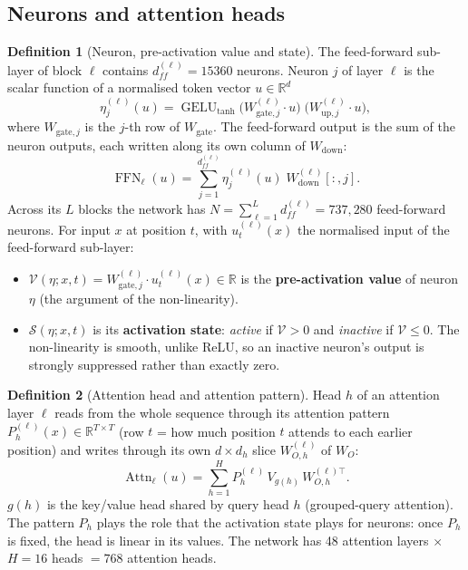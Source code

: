 \documentclass[10pt,a4paper]{article}
\newcommand{\op}[1]{\operatorname{#1}}
\theoremstyle{definition}
\newtheorem{definition}{Definition}[section]
\begin{document}
\subsection{Neurons and attention heads}
\begin{definition}[Neuron, pre-activation value and state]
The feed-forward sub-layer of block $\ell$ contains $d_{ff}^{(\ell)}=15360$ neurons. Neuron $j$ of layer $\ell$ is the scalar function of a normalised token vector $u\in\mathbb{R}^{d}$
\begin{equation}
  \eta^{(\ell)}_j(u) = \op{GELU}_{\tanh}\big(W^{(\ell)}_{\mathrm{gate},j}\cdot u\big)\;\big(W^{(\ell)}_{\mathrm{up},j}\cdot u\big),
\end{equation}
where $W_{\mathrm{gate},j}$ is the $j$-th row of $W_{\mathrm{gate}}$. The feed-forward output is the sum of the neuron outputs, each written along its own column of $W_{\mathrm{down}}$:
\begin{equation}
  \op{FFN}_\ell(u) = \sum_{j=1}^{d_{ff}^{(\ell)}} \eta^{(\ell)}_j(u)\;W^{(\ell)}_{\mathrm{down}}[:,j].
\end{equation}
Across its $L$ blocks the network has $N=\sum_{\ell=1}^{L} d_{ff}^{(\ell)}=737{,}280$ feed-forward neurons. For input $x$ at position $t$, with $u^{(\ell)}_t(x)$ the normalised input of the feed-forward sub-layer:
\begin{itemize}
\item $\mathcal{V}(\eta;x,t)=W^{(\ell)}_{\mathrm{gate},j}\cdot u^{(\ell)}_t(x)\in\mathbb{R}$ is the \textbf{pre-activation value} of neuron $\eta$ (the argument of the non-linearity).
\item $\mathcal{S}(\eta;x,t)$ is its \textbf{activation state}: \emph{active} if $\mathcal{V}>0$ and \emph{inactive} if $\mathcal{V}\le 0$. The non-linearity is smooth, unlike ReLU, so an inactive neuron's output is strongly suppressed rather than exactly zero.
\end{itemize}
\end{definition}
\begin{definition}[Attention head and attention pattern]
Head $h$ of an attention layer $\ell$ reads from the whole sequence through its attention pattern $P^{(\ell)}_h(x)\in\mathbb{R}^{T\times T}$ (row $t$ = how much position $t$ attends to each earlier position) and writes through its own $d\times d_h$ slice $W^{(\ell)}_{O,h}$ of $W_O$:
\begin{equation}
  \op{Attn}_\ell(u) = \sum_{h=1}^{H} P^{(\ell)}_h\,V_{g(h)}\,W^{(\ell)\top}_{O,h}.
\end{equation}
$g(h)$ is the key/value head shared by query head $h$ (grouped-query attention). The pattern $P_h$ plays the role that the activation state plays for neurons: once $P_h$ is fixed, the head is linear in its values. The network has 48 attention layers $\times$ $H=16$ heads $=768$ attention heads.
\end{definition}
\end{document}
